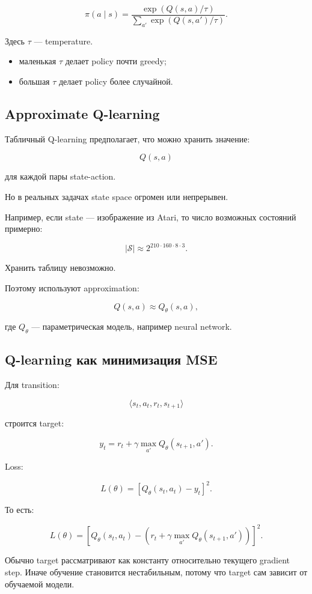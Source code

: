 \documentclass[a4paper,12pt]{article}
\begin{document}
\[
\pi(a\mid s)
=
\frac{
\exp(Q(s,a)/\tau)
}{
\sum_{a'}
\exp(Q(s,a')/\tau)
}.
\]

Здесь \(\tau\) --- temperature.

\begin{itemize}
    \item маленькая \(\tau\) делает policy почти greedy;
    \item большая \(\tau\) делает policy более случайной.
\end{itemize}

\subsection{Approximate Q-learning}

Табличный Q-learning предполагает, что можно хранить значение:

\[
Q(s,a)
\]

для каждой пары state-action.

Но в реальных задачах state space огромен или непрерывен.

Например, если state --- изображение из Atari, то число возможных состояний примерно:

\[
|\mathcal{S}| \approx 2^{210\cdot160\cdot8\cdot3}.
\]

Хранить таблицу невозможно.

Поэтому используют approximation:

\[
Q(s,a) \approx Q_\theta(s,a),
\]

где \(Q_\theta\) --- параметрическая модель, например neural network.

\subsection{Q-learning как минимизация MSE}

Для transition:

\[
\langle s_t,a_t,r_t,s_{t+1} \rangle
\]

строится target:

\[
y_t
=
r_t
+
\gamma
\max_{a'}Q_\theta(s_{t+1},a').
\]

Loss:

\[
L(\theta)
=
\left[
Q_\theta(s_t,a_t)
-
y_t
\right]^2.
\]

То есть:

\[
L(\theta)
=
\left[
Q_\theta(s_t,a_t)
-
\left(
r_t
+
\gamma
\max_{a'}Q_\theta(s_{t+1},a')
\right)
\right]^2.
\]

Обычно target рассматривают как константу относительно текущего gradient step. Иначе обучение становится нестабильным, потому что target сам зависит от обучаемой модели.
\end{document}
